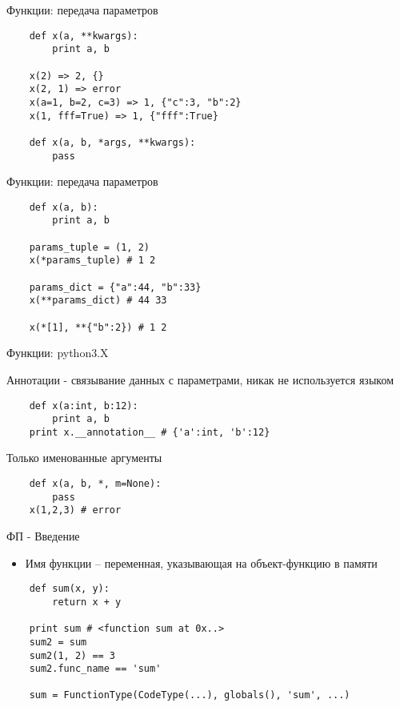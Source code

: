\documentclass{article}
\begin{document}
\begin{center} Функции: передача параметров \end{center}
\vspace{15pt}
\begin{lstlisting}
    def x(a, **kwargs):
        print a, b

    x(2) => 2, {}
    x(2, 1) => error
    x(a=1, b=2, c=3) => 1, {"c":3, "b":2}
    x(1, fff=True) => 1, {"fff":True}

    def x(a, b, *args, **kwargs):
        pass
\end{lstlisting}
\newpage

\begin{center} Функции: передача параметров \end{center}
\vspace{15pt}
\begin{lstlisting}
    def x(a, b):
        print a, b

    params_tuple = (1, 2)
    x(*params_tuple) # 1 2

    params_dict = {"a":44, "b":33}
    x(**params_dict) # 44 33

    x(*[1], **{"b":2}) # 1 2
\end{lstlisting}
\newpage

\begin{center} Функции: python3.X \end{center}
\vspace{15pt}
Аннотации - связывание данных с параметрами, никак не используется языком
\begin{lstlisting}
    def x(a:int, b:12):
        print a, b
    print x.__annotation__ # {'a':int, 'b':12}
\end{lstlisting}
Только именованные аргументы
\begin{lstlisting}
    def x(a, b, *, m=None):
        pass
    x(1,2,3) # error
\end{lstlisting}
\newpage

\begin{center} ФП - Введение \end{center}
\begin{itemize}
    \item Имя функции – переменная, указывающая на объект-функцию в памяти
\end{itemize}
\vspace{15pt}
\begin{lstlisting}
    def sum(x, y):
        return x + y

    print sum # <function sum at 0x..>
    sum2 = sum
    sum2(1, 2) == 3
    sum2.func_name == 'sum'

    sum = FunctionType(CodeType(...), globals(), 'sum', ...)
\end{lstlisting}
\newpage
\end{document}
